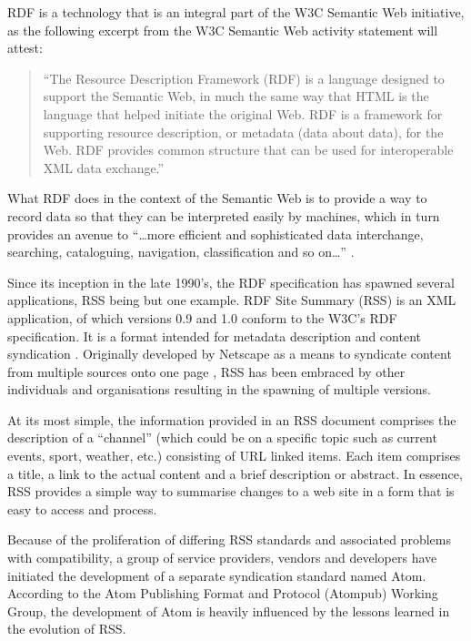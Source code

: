 \documentclass{CRPITStyle}
\begin{document}
RDF is a technology that is an integral part of the W3C Semantic Web
initiative, as the following excerpt from the W3C Semantic Web activity
statement will attest:

\begin{quotation}
	``The Resource Description Framework (RDF) is a language designed to
	support the Semantic Web, in much the same way that HTML is the
	language that helped initiate the original Web. RDF is a framework
	for supporting resource description, or metadata (data about data),
	for the Web. RDF provides common structure that can be used for
	interoperable XML data exchange.'' \cite{Powe-S-2003-RDF}
\end{quotation}

What RDF does in the context of the Semantic Web is to provide a way to
record data so that they can be interpreted easily by machines, which in
turn provides an avenue to ``\ldots{}more efficient and sophisticated
data interchange, searching, cataloguing, navigation, classification and
so on\ldots{}'' \cite{Powe-S-2003-RDF}.

Since its inception in the late 1990's, the RDF specification has
spawned several applications, RSS being but one example. RDF Site
Summary (RSS) is an XML application, of which versions 0.9 and 1.0
conform to the W3C's RDF specification. It is a format intended for
metadata description and content syndication \cite{Mano-F-2004-RDF}.
Originally developed by Netscape as a means to syndicate content from
multiple sources onto one page \cite{Nott-M-2005-Atom}, RSS has been
embraced by other individuals and organisations resulting in the
spawning of multiple versions.

At its most simple, the information provided in an RSS document
comprises the description of a ``channel'' (which could be on a specific
topic such as current events, sport, weather, etc.) consisting of URL
linked items. Each item comprises a title, a link to the actual content
and a brief description or abstract. In essence, RSS provides a simple
way to summarise changes to a web site in a form that is easy to access
and process.

Because of the proliferation of differing RSS standards and associated
problems with compatibility, a group of service providers, vendors and
developers have initiated the development of a separate syndication
standard named Atom. According to the Atom Publishing Format and
Protocol (Atompub) Working Group, the development of Atom is heavily
influenced by the lessons learned in the evolution of RSS.
\end{document}
